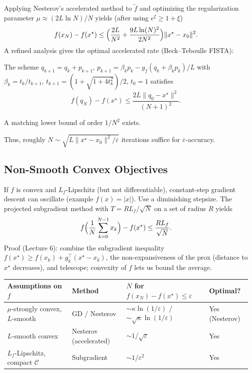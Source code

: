 Applying Nesterov's accelerated method to $\tilde{f}$ and optimizing
the regularization parameter $\mu\approx(2L\ln N)/N$ yields (after
using $e^\xi\ge1+\xi$)
\[
  f(x_N)-f(x^\star)\le\Bigl(\frac{2L}{N^2}+\frac{9L\ln(N)^2}{2N^2}\Bigr)\|x^\star-x_0\|^2.
\]
A refined analysis gives the optimal accelerated rate (Beck–Teboulle FISTA):
\begin{theorem}
  The scheme $q_{k+1}=q_k+p_{k+1}$, $p_{k+1}=\beta_k
  p_k-g_f(q_k+\beta_k p_k)/L$ with $\beta_k=t_k/t_{k+1}$,
  $t_{k+1}=(1+\sqrt{1+4t_k^2})/2$, $t_0=1$ satisfies
  \[
    f(q_N)-f(x^\star)\le\frac{2L\|q_0-x^\star\|^2}{(N+1)^2}.
  \]
\end{theorem}
A matching lower bound of order $1/N^2$ exists.

Thus, roughly $N\sim\sqrt{L\|x^\star-x_0\|^2/\varepsilon}$ iterations
suffice for $\varepsilon$-accuracy.

\subsection{Non-Smooth Convex Objectives}
If $f$ is convex and $L_f$-Lipschitz (but not differentiable),
constant-step gradient descent can oscillate (example $f(x)=|x|$).
Use a diminishing stepsize. The projected subgradient method with
$T=R L_f/\sqrt{N}$ on a set of radius $R$ yields
\[
  f\Bigl(\frac1N\sum_{k=0}^{N-1}x_k\Bigr)-f(x^\star)\le\frac{R L_f}{\sqrt{N}}.
\]
Proof (Lecture 6): combine the subgradient inequality $f(x^\star)\ge
f(x_k)+g_k^\top(x^\star-x_k)$, the non-expansiveness of the prox
(distance to $x^\star$ decreases), and telescope; convexity of $f$
lets us bound the average.

\begin{table}[ht]
  \centering
  \begin{tabular}{llll}
    \toprule
    Assumptions on $f$ & Method & $N$ for
    $f(x_N)-f(x^\star)\le\varepsilon$ & Optimal? \\
    \midrule
    $\mu$-strongly convex, $L$-smooth & GD / Nesterov &
    $\sim\kappa\ln(1/\varepsilon)$ /
    $\sim\sqrt{\kappa}\ln(1/\varepsilon)$ & Yes (Nesterov) \\
    $L$-smooth convex & Nesterov (accelerated) &
    $\sim1/\sqrt{\varepsilon}$ & Yes \\
    $L_f$-Lipschitz, compact $\mathcal{C}$ & Subgradient &
    $\sim1/\varepsilon^2$ & Yes \\
    \bottomrule
  \end{tabular}
\end{table}

